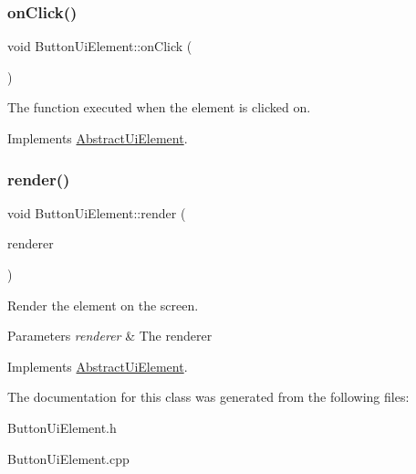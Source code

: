 \subsubsection{\texorpdfstring{on\+Click()}{onClick()}}
{\footnotesize\ttfamily void Button\+Ui\+Element\+::on\+Click (\begin{DoxyParamCaption}{ }\end{DoxyParamCaption})\hspace{0.3cm}{\ttfamily [virtual]}}



The function executed when the element is clicked on. 



Implements \mbox{\hyperlink{class_abstract_ui_element_a42296c15c9e70b6ac7fda0b1862612af}{Abstract\+Ui\+Element}}.

\mbox{\label{class_button_ui_element_ad319e20e8abedefe07aef58a38ae9a81}} 
\subsubsection{\texorpdfstring{render()}{render()}}
{\footnotesize\ttfamily void Button\+Ui\+Element\+::render (\begin{DoxyParamCaption}\item[{S\+D\+L\+\_\+\+Renderer $\ast$}]{renderer }\end{DoxyParamCaption})\hspace{0.3cm}{\ttfamily [virtual]}}



Render the element on the screen. 


\begin{DoxyParams}{Parameters}
{\em renderer} & The renderer\\
\hline
\end{DoxyParams}


Implements \mbox{\hyperlink{class_abstract_ui_element_afacedc89a5805d95d3bdcf20619b1c06}{Abstract\+Ui\+Element}}.



The documentation for this class was generated from the following files\+:\begin{DoxyCompactItemize}
\item 
Button\+Ui\+Element.\+h\item 
Button\+Ui\+Element.\+cpp\end{DoxyCompactItemize}
